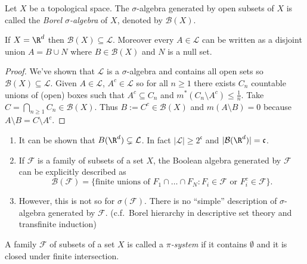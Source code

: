 \documentclass[a4paper]{article}
\begin{document}
\begin{definition}
  Let \(X\) be a topological space. The \(\sigma\)-algebra generated by open subsets of \(X\) is called the \emph{Borel \(\sigma\)-algebra} of \(X\), denoted by \(\mathcal B(X)\).
\end{definition}

\begin{proposition}
  If \(X = \R^d\) then \(\mathcal B(X) \subseteq \mathcal L\). Moreover every \(A \in \mathcal L\) can be written as a disjoint union \(A = B \cup N\) where \(B \in \mathcal B(X)\) and \(N\) is a null set.
\end{proposition}


\begin{proof}
  We've shown that \(\mathcal L\) is a \(\sigma\)-algebra and contains all open sets so \(\mathcal B(X) \subseteq \mathcal L\). Given \(A \in \mathcal L\), \(A^c \in \mathcal L\) so for all \(n \geq 1\) there exists \(C_n\) countable unions of (open) boxes such that \(A^c \subseteq C_n\) and \(m^*(C_n \setminus A^c) \leq \frac{1}{n}\). Take \(C = \bigcap_{n \geq 1} C_n \in \mathcal B(X)\). Thus \(B := C^c \in \mathcal B(X)\) and \(m(A \setminus B) = 0\) because \(A \setminus B = C \setminus A^c\).
\end{proof}

\begin{remark}\leavevmode
  \begin{enumerate}
  \item It can be shown that \(B(\R^d) \subsetneq \mathcal L\). In fact \(|\mathcal L| \geq 2^{\mathfrak c}\) and \(|\mathcal B(\R^d)| = \mathfrak c\).
  \item If \(\mathcal F\) is a family of subsets of a set \(X\), the Boolean algebra generated by \(\mathcal F\) can be explicitly described as
    \[
      \mathcal B(\mathcal F) = \{\text{finite unions of } F_1 \cap \dots \cap F_N: F_i \in \mathcal F \text{ or } F_i^c \in \mathcal F\}.
    \]
  \item However, this is not so for \(\sigma(\mathcal F)\). There is no ``simple'' description of \(\sigma\)-algebra generated by \(\mathcal F\). (c.f.\ Borel hierarchy in descriptive set theory and transfinite induction)
  \end{enumerate}
\end{remark}

\begin{definition}[\(\pi\)-system]
  A family \(\mathcal F\) of subsets of a set \(X\) is called a \emph{\(\pi\)-system} if it contains \(\emptyset\) and it is closed under finite intersection.
\end{definition}
\end{document}
